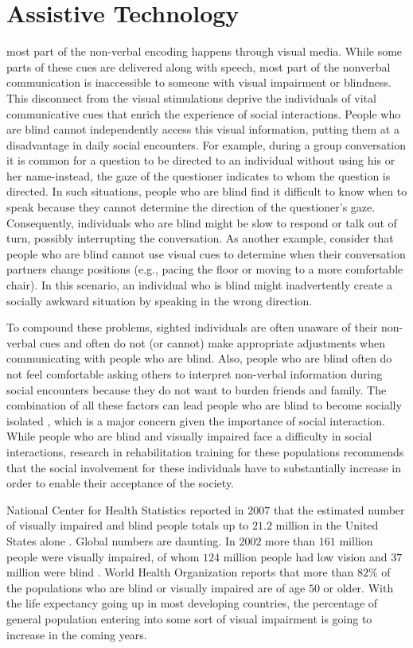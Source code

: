 \documentclass[oneside,11pt]{memoir}
\begin{document}
\section{Assistive Technology}
most part of the non-verbal encoding happens through visual media. While some parts of these cues are delivered along with speech, most part of the nonverbal communication is inaccessible to someone with visual impairment or blindness. This disconnect from the visual stimulations deprive the individuals of vital communicative cues that enrich the experience of social interactions.  People who are blind cannot independently access this visual information, putting them at a disadvantage in daily social encounters.  For example, during a group conversation it is common for a question to be directed to an individual without using his or her name-instead, the gaze of the questioner indicates to whom the question is directed. In such situations, people who are blind find it difficult to know when to speak because they cannot determine the direction of the questioner's gaze. Consequently, individuals who are blind might be slow to respond or talk out of turn, possibly interrupting the conversation. As another example, consider that people who are blind cannot use visual cues to determine when their conversation partners change positions (e.g., pacing the floor or moving to a more comfortable chair). In this scenario, an individual who is blind might inadvertently create a socially awkward situation by speaking in the wrong direction.

To compound these problems, sighted individuals are often unaware of their non-verbal cues and often do not (or cannot) make appropriate adjustments when communicating with people who are blind. Also, people who are blind often do not feel comfortable asking others to interpret non-verbal information during social encounters because they do not want to burden friends and family.  The combination of all these factors can lead people who are blind to become socially isolated \cite{segrin_poor_2000}, which is a major concern given the importance of social interaction. While people who are blind and visually impaired face a difficulty in social interactions, research in rehabilitation training for these populations recommends that the social involvement for these individuals have to substantially increase in order to enable their acceptance of the society.

National Center for Health Statistics reported in $2007$ that the estimated number of visually impaired and blind people totals up to $21.2$ million in the United States alone . Global numbers are daunting. In $2002$ more than $161$ million people were visually impaired, of whom $124$ million people had low vision and $37$ million were blind . World Health Organization reports that more than $82$\% of the populations who are blind or visually impaired are of age $50$ or older. With the life expectancy going up in most developing countries, the percentage of general population entering into some sort of visual impairment is going to increase in the coming years.
\end{document}
